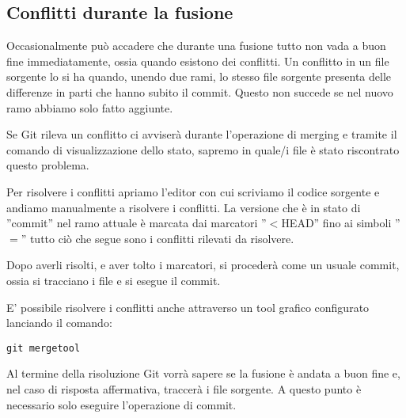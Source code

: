 \subsection{Conflitti durante la fusione}
Occasionalmente può accadere che durante una fusione tutto non vada a buon fine immediatamente, ossia quando esistono dei conflitti. Un conflitto in un file sorgente lo si ha quando, unendo due rami, lo stesso file sorgente presenta delle differenze in parti che hanno subito il commit. Questo non succede se nel nuovo ramo abbiamo solo fatto aggiunte.

Se Git rileva un conflitto ci avviserà durante l'operazione di merging e tramite il comando di visualizzazione dello stato, sapremo in quale/i file è stato riscontrato questo problema.

Per risolvere i conflitti apriamo l'editor con cui scriviamo il codice sorgente e andiamo manualmente a risolvere i conflitti. La versione che è in stato di ''commit'' nel ramo attuale è marcata dai marcatori ''$<$HEAD'' fino ai simboli ''$=$'' tutto ciò che segue sono i conflitti rilevati da risolvere.

Dopo averli risolti, e aver tolto i marcatori, si procederà come un usuale commit, ossia si tracciano i file e si esegue il commit.

E' possibile risolvere i conflitti anche attraverso un tool grafico configurato lanciando il comando:

\begin{center}
\texttt{git mergetool}
\end{center}

Al termine della risoluzione Git vorrà sapere se la fusione è andata a buon fine e, nel caso di risposta affermativa, traccerà i file sorgente. A questo punto è necessario solo eseguire l'operazione di commit.
